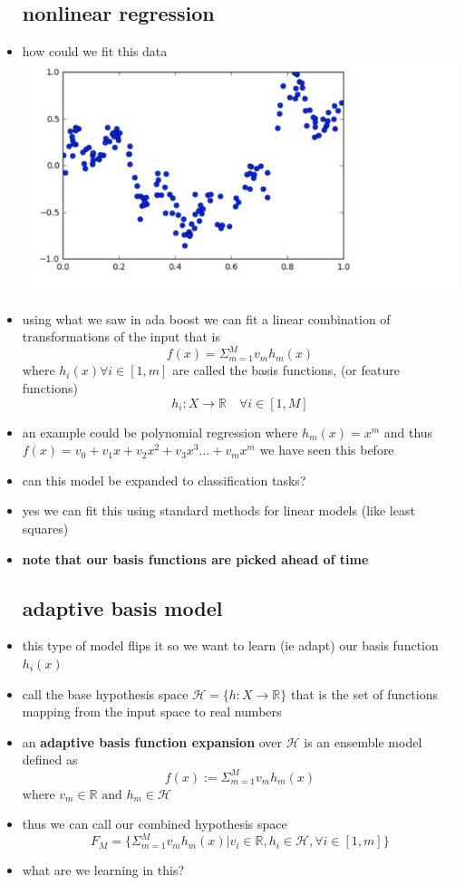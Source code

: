 \documentclass{article}
\begin{document}
\begin{itemize}
\subsection{nonlinear regression}
\item how could we fit this data \\ \includegraphics{lecture_notes/lecture_10/immages/l10_1.jpg}
\item using what we saw in ada boost we can fit a linear combination of transformations of the input that is $$f(x)=\Sigma_{m=1}^{M}v_{m}h_{m}(x)$$
 where $h_{i}(x)\forall i\in [1,m]$ are called the basis functions, (or feature functions) $$h_{i}:X\rightarrow \mathbb{R} \quad \forall i\in [1,M]$$
 \item an example could be polynomial regression where $h_{m}(x)=x^m$ and thus $f(x)=v_0+v_1x+v_2x^2+v_3x^3...+v_mx^m$ we have seen this before 
 \item can this model be expanded to classification tasks?
 \item yes we can fit this using standard methods for linear models (like least squares) 
 \item \textbf{note that our basis functions are picked ahead of time}
\subsection{adaptive basis model}
\item this type of model flips it so we want to learn (ie adapt) our basis function $h_{i}(x)$
\item call the base hypothesis space $\mathcal{H}=\{h:X\rightarrow \mathbb{R}\}$ that is the set of functions mapping from the input space to real numbers 
\item an \textbf{adaptive basis function expansion } over $\mathcal{H}$ is an ensemble model defined as $$f(x):=\Sigma_{m=1}^{M}v_{m}h_m(x)$$ where $v_m\in \mathbb{R} \text{ and } h_m\in \mathcal{H}$
\item thus we can call our combined hypothesis space $$F_{M}=\{\Sigma_{m=1}^{M}v_{m}h_m(x)|v_i\in \mathbb{R}, h_{i}\in \mathcal{H}, \forall i \in [1,m]\}$$
\item what are we learning in this? 

\end{itemize}
\end{document}
